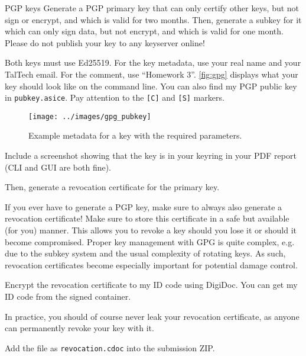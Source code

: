 \documentclass{homework}
\begin{document}
\begin{task}{PGP keys}
  Generate a PGP primary key that can only certify other keys, but not sign or encrypt, and which is valid for two months.
  Then, generate a subkey for it which can only sign data, but not encrypt, and which is valid for one month.
  Please do not publish your key to any keyserver online!

  Both keys must use Ed25519.
  For the key metadata, use your real name and your TalTech email.
  For the comment, use \enquote{Homework 3}.
  \autoref{fig:gpg} displays what your key should look like on the command line.
  You can also find my PGP public key in \texttt{pubkey.asice}.
  Pay attention to the \texttt{[C]} and \texttt{[S]} markers.

  \begin{figure}[h!]
    \center
    \texttt{[image: ../images/gpg\_pubkey]}
    \caption{Example metadata for a key with the required parameters.}
    \label{fig:gpg}
  \end{figure}

  Include a screenshot showing that the key is in your keyring in your PDF report (CLI and GUI are both fine).

  Then, generate a revocation certificate for the primary key.

  \begin{tcolorbox}
    If you ever have to generate a PGP key, make sure to always also generate a revocation certificate!
    Make sure to store this certificate in a safe but available (for you) manner.
    This allows you to revoke a key should you lose it or should it become compromised.
    \tcblower
    Proper key management with GPG is quite complex, e.g. due to the subkey system and the usual complexity of rotating keys.
    As such, revocation certificates become especially important for potential damage control.
  \end{tcolorbox}

  Encrypt the revocation certificate to my ID code using DigiDoc.
  You can get my ID code from the signed container.
  \begin{tcolorbox}
    In practice, you should of course never leak your revocation certificate, as anyone can permanently revoke your key with it.
  \end{tcolorbox}

  Add the file as \texttt{revocation.cdoc} into the submission ZIP.
\end{task}
\end{document}
